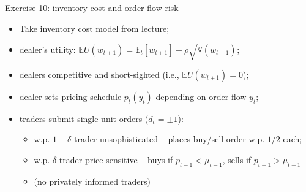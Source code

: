 \documentclass[english,10pt]{beamer}
\begin{document}
\begin{frame}[label=ex10]{Exercise 10: inventory cost and order flow risk}
	\begin{itemize}
		\item Take inventory cost model from lecture;
		\item dealer's utility: $\mathbb{E}U(w_{t+1}) = \mathbb{E}_t [w_{t+1}] - \rho \sqrt{\mathbb{V}(w_{t+1})}$;
		\item dealers competitive and short-sighted (i.e., $\mathbb{E}U(w_{t+1})=0$);
		\item dealer sets pricing schedule $p_t(y_t)$ depending on order flow $y_t$;
		\item traders submit single-unit orders ($d_t = \pm 1$):
		\begin{itemize}
			\item w.p. $1-\delta$ trader unsophisticated -- places buy/sell order w.p. $1/2$ each;
			\item w.p. $\delta$ trader price-sensitive -- buys if $p_{t-1} < \mu_{t-1}$, sells if $p_{t-1} > \mu_{t-1}$
			\item (no privately informed traders)
		\end{itemize}
	\end{itemize}
\end{frame}
\end{document}
